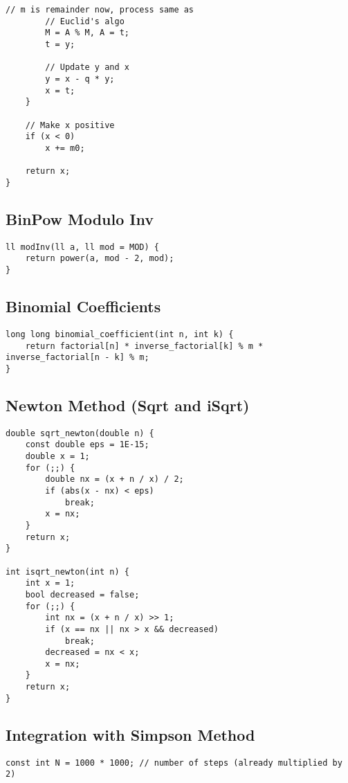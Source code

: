\documentclass[10pt]{article}
\begin{document}
\begin{multicols*}{2}
\begin{lstlisting}[style=compactcpp]
        // m is remainder now, process same as
        // Euclid's algo
        M = A % M, A = t;
        t = y;

        // Update y and x
        y = x - q * y;
        x = t;
    }

    // Make x positive
    if (x < 0)
        x += m0;

    return x;
}
\end{lstlisting}

\subsection{BinPow Modulo Inv}
\begin{lstlisting}[style=compactcpp]
ll modInv(ll a, ll mod = MOD) {
    return power(a, mod - 2, mod);
}

\end{lstlisting}
\subsection{Binomial Coefficients}
\begin{lstlisting}[style=compactcpp]
long long binomial_coefficient(int n, int k) {
    return factorial[n] * inverse_factorial[k] % m * inverse_factorial[n - k] % m;
}
\end{lstlisting}
\subsection{Newton Method (Sqrt and iSqrt)}
\begin{lstlisting}[style=compactcpp]
double sqrt_newton(double n) {
    const double eps = 1E-15;
    double x = 1;
    for (;;) {
        double nx = (x + n / x) / 2;
        if (abs(x - nx) < eps)
            break;
        x = nx;
    }
    return x;
}

int isqrt_newton(int n) {
    int x = 1;
    bool decreased = false;
    for (;;) {
        int nx = (x + n / x) >> 1;
        if (x == nx || nx > x && decreased)
            break;
        decreased = nx < x;
        x = nx;
    }
    return x;
}
\end{lstlisting}
\subsection{Integration with Simpson Method}
\begin{lstlisting}[style=compactcpp]
const int N = 1000 * 1000; // number of steps (already multiplied by 2)


\end{lstlisting}
\end{multicols*}
\end{document}
